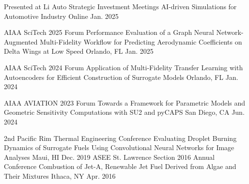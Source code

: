 \begin{cventries}
\cvsmallentries
    {Presented at Li Auto Strategic Investment Meetings} %
    {AI-driven Simulations for Automotive Industry} %
    {Online} %
    {Jan. 2025} %
    {
    }

\cvsmallentries
    {AIAA SciTech 2025 Forum} %
    {Performance Evaluation of a Graph Neural Network-Augmented Multi-Fidelity Workflow for Predicting Aerodynamic Coefficients on Delta Wings at Low Speed} %
    {Orlando, FL} %
    {Jan. 2025} %
    {
    }

\cvsmallentries
    {AIAA SciTech 2024 Forum} %
    {Application of Multi-Fidelity Transfer Learning with Autoencoders for Efficient Construction of Surrogate Models} %
    {Orlando, FL} %
    {Jan. 2024} %
    {
    }

\cvsmallentries
    {AIAA AVIATION 2023 Forum} %
    {Towards a Framework for Parametric Models and Geometric Sensitivity Computations with SU2 and pyCAPS} %
    {San Diego, CA} %
    {Jun. 2024} %
    {
    }

\cvsmallentries
    {2nd Pacific Rim Thermal Engineering Conference} %
    {Evaluating Droplet Burning Dynamics of Surrogate Fuels Using Convolutional Neural Networks for Image Analyses} %
    {Maui, HI} %
    {Dec. 2019} %
    {
    }
\cvsmallentries
    {ASEE St. Lawrence Section 2016 Annual Conference} %
    {Combustion of Jet-A, Renewable Jet Fuel Derived from Algae and Their Mixtures} %
    {Ithaca, NY} %
    {Apr. 2016} %
    {
    }
\end{cventries}
